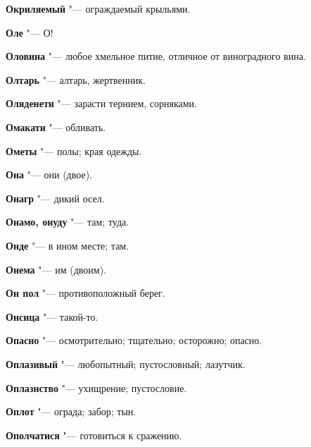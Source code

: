 \begin{mymulticols}{2}
\noindent\textbf{Окриляемый} "--- ограждаемый крыльями. 




\noindent\textbf{Оле} "--- О! 




\noindent\textbf{Оловина} "--- любое хмельное питие, отличное от виноградного вина. 




\noindent\textbf{Олтарь} "--- алтарь, жертвенник. 




\noindent\textbf{Оляденети} "--- зарасти тернием, сорняками. 




\noindent\textbf{Омакати} "--- обливать. 




\noindent\textbf{Ометы} "--- полы; края одежды. 




\noindent\textbf{Она} "--- они (двое). 




\noindent\textbf{Онагр} "--- дикий осел. 




\noindent\textbf{Онамо, онуду} "--- там; туда. 




\noindent\textbf{Онде} "--- в ином месте; там. 




\noindent\textbf{Онема} "--- им (двоим). 




\noindent\textbf{Он пол} "--- противоположный берег. 




\noindent\textbf{Онсица} "--- такой-то. 




\noindent\textbf{Опасно} "--- осмотрительно; тщательно; осторожно; опасно. 




\noindent\textbf{Оплазивый} "--- любопытный; пустословный; лазутчик. 




\noindent\textbf{Оплазнство} "--- ухищрение; пустословие. 




\noindent\textbf{Оплот} "--- ограда; забор; тын. 




\noindent\textbf{Ополчатися} "--- готовиться к сражению. 





\end{mymulticols}
